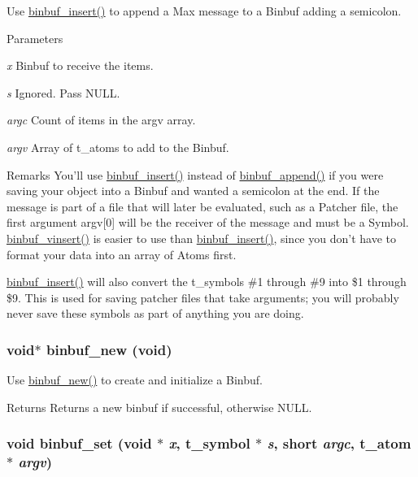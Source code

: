 Use \hyperlink{group__binbuf_gad8f2272c95a8e89f22f1a9c67272af5e}{binbuf\_\-insert()} to append a Max message to a Binbuf adding a semicolon. 
\begin{DoxyParams}{Parameters}
\item[{\em x}]Binbuf to receive the items. \item[{\em s}]Ignored. Pass NULL. \item[{\em argc}]Count of items in the argv array. \item[{\em argv}]Array of t\_\-atoms to add to the Binbuf.\end{DoxyParams}
\begin{DoxyRemark}{Remarks}
You’ll use \hyperlink{group__binbuf_gad8f2272c95a8e89f22f1a9c67272af5e}{binbuf\_\-insert()} instead of \hyperlink{group__binbuf_ga57f584204ff1860c93ca728ca991fb15}{binbuf\_\-append()} if you were saving your object into a Binbuf and wanted a semicolon at the end. If the message is part of a file that will later be evaluated, such as a Patcher file, the first argument argv\mbox{[}0\mbox{]} will be the receiver of the message and must be a Symbol. \hyperlink{group__binbuf_ga8bc71e59211549a9927754452b2d9e21}{binbuf\_\-vinsert()} is easier to use than \hyperlink{group__binbuf_gad8f2272c95a8e89f22f1a9c67272af5e}{binbuf\_\-insert()}, since you don’t have to format your data into an array of Atoms first.
\end{DoxyRemark}
\hyperlink{group__binbuf_gad8f2272c95a8e89f22f1a9c67272af5e}{binbuf\_\-insert()} will also convert the t\_\-symbols \#1 through \#9 into \$1 through \$9. This is used for saving patcher files that take arguments; you will probably never save these symbols as part of anything you are doing. \hypertarget{group__binbuf_ga4a6b741be0bee8626b4cb25baa453060}{
\subsubsection[{binbuf\_\-new}]{\setlength{\rightskip}{0pt plus 5cm}void$\ast$ binbuf\_\-new (void)}}
\label{group__binbuf_ga4a6b741be0bee8626b4cb25baa453060}


Use \hyperlink{group__binbuf_ga4a6b741be0bee8626b4cb25baa453060}{binbuf\_\-new()} to create and initialize a Binbuf. \begin{DoxyReturn}{Returns}
Returns a new binbuf if successful, otherwise NULL. 
\end{DoxyReturn}
\hypertarget{group__binbuf_ga716d66a159b96b7b9d87baaab33367e0}{
\subsubsection[{binbuf\_\-set}]{\setlength{\rightskip}{0pt plus 5cm}void binbuf\_\-set (void $\ast$ {\em x}, \/  {\bf t\_\-symbol} $\ast$ {\em s}, \/  short {\em argc}, \/  {\bf t\_\-atom} $\ast$ {\em argv})}}
\label{group__binbuf_ga716d66a159b96b7b9d87baaab33367e0}



